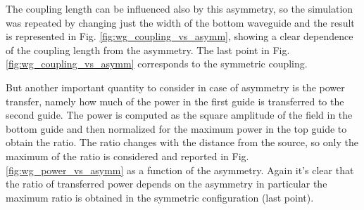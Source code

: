 The coupling length can be influenced also by this asymmetry, so the simulation was repeated by changing just the width of the bottom waveguide and the result is represented in Fig. \ref{fig:wg_coupling_vs_asymm}, showing a clear dependence of the coupling length from the asymmetry. The last point in Fig. \ref{fig:wg_coupling_vs_asymm} corresponds to the symmetric coupling.

But another important quantity to consider in case of asymmetry is the power transfer, namely how much of the power in the first guide is transferred to the second guide. The power is computed as the square amplitude of the field in the bottom guide and then normalized for the maximum power in the top guide to obtain the ratio. The ratio changes with the distance from the source, so only the maximum of the ratio is considered and reported in Fig. \ref{fig:wg_power_vs_asymm} as a function of the asymmetry. Again it's clear that the ratio of transferred power depends on the asymmetry in particular the maximum ratio is obtained in the symmetric configuration (last point).

